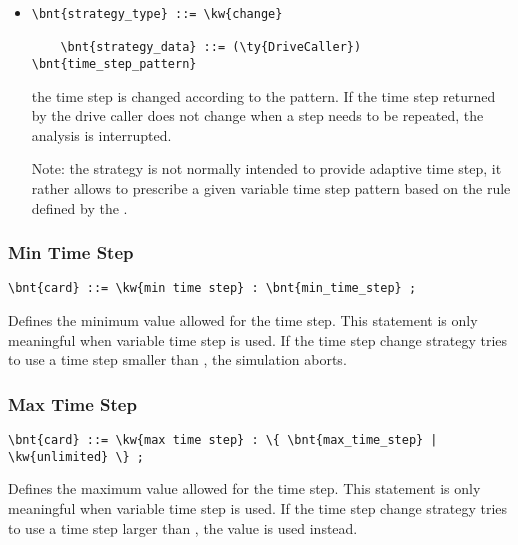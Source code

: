 \begin{itemize}
\item {}
\begin{Verbatim}[commandchars=\\\{\}]
    \bnt{strategy_type} ::= \kw{change}

    \bnt{strategy_data} ::= (\ty{DriveCaller}) \bnt{time_step_pattern}
\end{Verbatim}
the time step is changed according to the  pattern.
If the time step returned by the drive caller does not change
when a step needs to be repeated, the analysis is interrupted.

Note: the  strategy is not normally intended to provide
adaptive time step, it rather allows to prescribe a given
variable time step pattern based on the rule defined
by the  .
\end{itemize}


\subsubsection{Min Time Step}
\begin{Verbatim}[commandchars=\\\{\}]
    \bnt{card} ::= \kw{min time step} : \bnt{min_time_step} ;
\end{Verbatim}
Defines the minimum value allowed for the time step.
This statement is only meaningful when variable time step is used.
If the time step change strategy tries to use a time step smaller
than , the simulation aborts.

\subsubsection{Max Time Step}
\begin{Verbatim}[commandchars=\\\{\}]
    \bnt{card} ::= \kw{max time step} : \{ \bnt{max_time_step} | \kw{unlimited} \} ;
\end{Verbatim}
Defines the maximum value allowed for the time step.
This statement is only meaningful when variable time step is used.
If the time step change strategy tries to use a time step larger
than , the value  is used instead.

